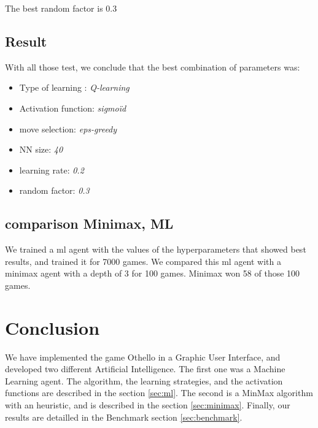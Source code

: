 \documentclass{article}
\begin{document}
The best random factor is 0.3

\newline

\subsection{Result}
With all those test, we conclude that the best combination of parameters was:
\begin{itemize}
    \item Type of learning : \textit{ Q-learning}
    \item Activation function: \textit{sigmoïd}
    \item move selection: \textit{eps-greedy}
    \item NN size: \textit{40}
    \item learning rate: \textit{0.2}
    \item random factor: \textit{0.3}
\end{itemize}

\subsection{comparison Minimax, ML}
We trained a ml agent with the values of the hyperparameters that showed best results, and trained it for 7000 games. We compared this ml agent with a minimax agent with a depth of 3 for 100 games. Minimax won 58 of those 100 games.

\section{Conclusion}
We have implemented the game Othello in a Graphic User Interface, and developed two different Artificial Intelligence. The first one was a Machine Learning agent. The algorithm, the learning strategies, and the activation functions are described in the section \ref{sec:ml}. The second is a MinMax algorithm with an heuristic, and is described in the section \ref{sec:minimax}.
Finally, our results are detailled in the Benchmark section \ref{sec:benchmark}.
\end{document}
